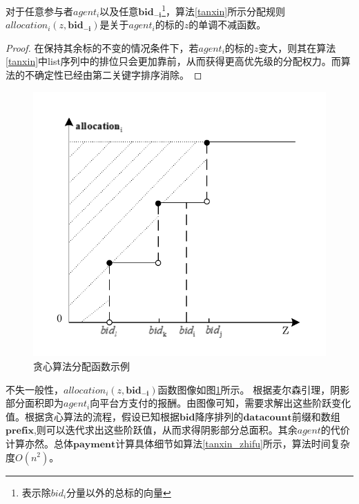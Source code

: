 \documentclass[promaster]{thesis-uestc}
\begin{document}
\begin{theorem}
    对于任意参与者$agent_i$以及任意$\mathbf{bid_{-i}}$\footnote{表示除$bid_i$分量以外的总标的向量}，算法\ref{tanxin}所示分配规则$allocation_i(z,\mathbf{bid_{-i}})$是关于$agent_i$的标的$z$的单调不减函数。
\end{theorem}

\begin{proof}
   在保持其余标的不变的情况条件下，若$agent_i$的标的$z$变大，则其在算法\ref{tanxin}中list序列中的排位只会更加靠前，从而获得更高优先级的分配权力。而算法的不确定性已经由第二关键字排序消除。
\end{proof}



\begin{figure}[h]
    \includegraphics[width=350pt]{pic/tanxin_allocation.pdf}
    \caption{贪心算法分配函数示例}
    \label{tanxin_allocation}
\end{figure}

不失一般性，$allocation_i(z,\mathbf{bid_{-i}})$函数图像如图\ref{tanxin_allocation}所示。
根据麦尔森引理，阴影部分面积即为$agent_i$向平台方支付的报酬。由图像可知，需要求解出这些阶跃变化值。根据贪心算法的流程，假设已知根据$\mathbf{bid}$降序排列的$\mathbf{datacount}$前缀和数组$\mathbf{prefix}$,则可以迭代求出这些阶跃值，从而求得阴影部分总面积。其余$agent$的代价计算亦然。总体$\mathbf{payment}$计算具体细节如算法\ref{tanxin_zhifu}所示，算法时间复杂度$O(n^2)$。
\end{document}
